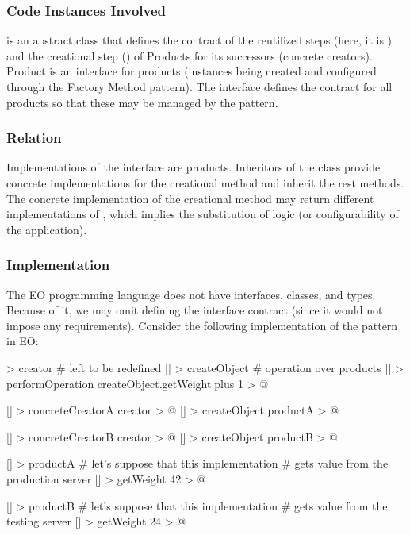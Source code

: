 \documentclass[12pt]{book}
\begin{document}
{{\subsubsection{Code Instances Involved}
 is an abstract class that defines the contract of the reutilized steps (here, it is ) and the creational step () of Products for its successors (concrete creators). 
Product is an interface for products (instances being created and configured through the Factory Method pattern). The interface defines the contract for all products so that these may be managed by the pattern.

\subsubsection{Relation}
Implementations of the  interface are products. Inheritors of the  class provide concrete implementations for the creational method and inherit the rest methods. The concrete implementation of the creational method may return different implementations of , which implies the substitution of logic (or configurability of the application). 

\subsubsection{Implementation}
The EO programming language does not have interfaces, classes, and types. Because of it, we may omit defining the  interface contract (since it would not impose any requirements). Consider the following implementation of the pattern in EO: 

\begin{ffcode}
[] > creator
  # left to be redefined
  [] > createObject
  # operation over products
  [] > performOperation
    createObject.getWeight.plus 1 > @

[] > concreteCreatorA
  creator > @
  [] > createObject
    productA > @

[] > concreteCreatorB
  creator > @
  [] > createObject
    productB > @

[] > productA
  # let's suppose that this implementation
  # gets value from the production server
  [] > getWeight
    42 > @

[] > productB
  # let's suppose that this implementation
  # gets value from the testing server
  [] > getWeight
          24 > @
\end{ffcode}

}}
\end{document}
